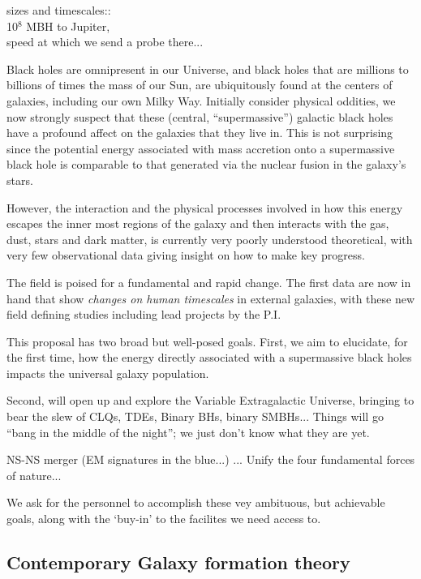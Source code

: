 \documentclass[11pt,a4paper]{article}
\begin{document}
sizes and timescales:: \\
10$^{8}$ MBH to Jupiter, \\
speed at which we send a probe there...\\




\newpage


Black holes are omnipresent in our Universe, and black holes that are
millions to billions of times the mass of our Sun, are ubiquitously
found at the centers of galaxies, including our own Milky Way.
Initially consider physical oddities, we now strongly suspect that
these (central, ``supermassive'') galactic black holes have a profound
affect on the galaxies that they live in. This is not surprising since
the potential energy associated with mass accretion onto a
supermassive black hole is comparable to that generated via the
nuclear fusion in the galaxy's stars.

However, the interaction and the physical processes involved in how
this energy escapes the inner most regions of the galaxy and then
interacts with the gas, dust, stars and dark matter, is currently very
poorly understood theoretical, with very few observational data giving
insight on how to make key progress.

The field is poised for a fundamental and rapid change. The first data are now in hand 
that show {\it changes on human timescales} in external galaxies, with these new 
field defining studies including lead projects by the P.I. 

This proposal has two broad but well-posed goals. 
First, we aim to elucidate, for the first time, how the energy directly associated with a 
supermassive black holes impacts the universal galaxy population.  

Second, will open up and explore the Variable Extragalactic Universe, bringing to bear 
the slew of 
CLQs, TDEs, Binary BHs, binary SMBHs... 
Things will go ``bang in the middle of the night''; we just don't know what 
they are yet. 

NS-NS merger (EM signatures in the blue...) ...
Unify the four fundamental forces of nature...


We ask for the personnel to accomplish these vey ambituous, 
but achievable goals, along with the `buy-in' to the facilites we need access to. 






\subsection{Contemporary Galaxy formation theory}
\end{document}
